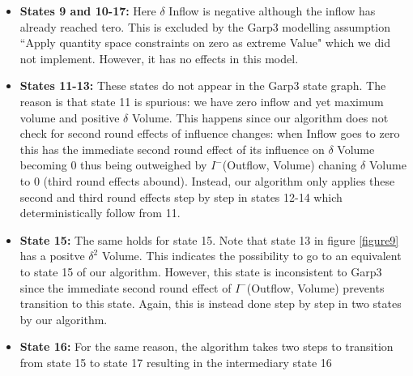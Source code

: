 \documentclass{article}
\begin{document}
\begin{itemize}
	\item \textbf{States 9 and 10-17:} Here $\delta$ Inflow is negative although the inflow has already reached tero. This is excluded by the Garp3 modelling assumption ``Apply quantity space constraints on zero as extreme Value" which we did not implement. However, it has no effects in this model.
	\item \textbf{States 11-13:} These states do not appear in the Garp3 state graph. The reason is that state 11 is spurious: we have zero inflow and yet maximum volume and positive $\delta$ Volume. This happens since our algorithm does not check for second round effects of influence changes: when Inflow goes to zero this has the immediate second round effect of its influence on $\delta$ Volume becoming 0 thus being outweighed by $I^-$(Outflow, Volume) chaning $\delta$ Volume to 0 (third round effects abound). Instead, our algorithm only applies these second and third round effects step by step in states 12-14 which deterministically follow from 11. 
	\item  \textbf{State 15:} The same holds for state 15. Note that state 13 in figure \ref{figure9} has a positve $\delta^2$ Volume. This indicates the possibility to go to an equivalent to state 15 of our algorithm. However, this state is inconsistent to Garp3 since the immediate second round effect of $I^-$(Outflow, Volume) prevents transition to this state. Again, this is instead done step by step in two states by our algorithm.
	\item \textbf{State 16:} For the same reason, the algorithm takes two steps to transition from state 15 to state 17 resulting in the intermediary state 16
\end{itemize}
\end{document}
